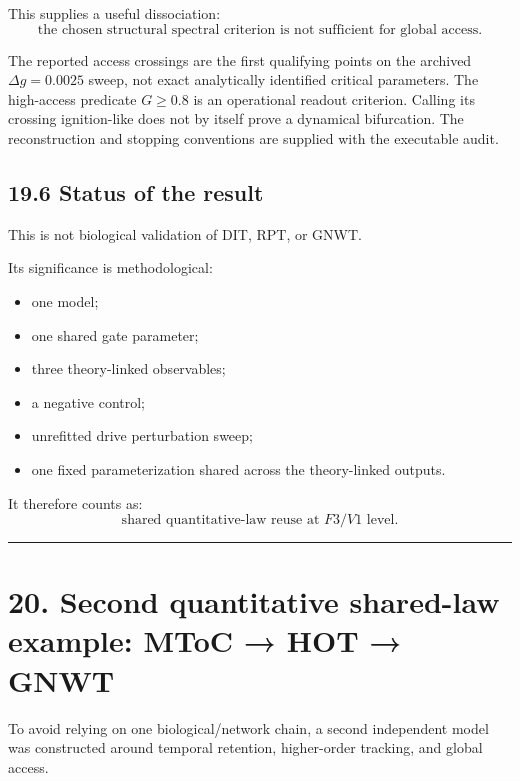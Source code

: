\documentclass[
  11pt,
  a4paper,
]{article}
\providecommand{\tightlist}{%
  \setlength{\itemsep}{0pt}\setlength{\parskip}{0pt}}
\begin{document}
This supplies a useful dissociation:
\nopagebreak[4]
\[
\boxed{
\text{the chosen structural spectral criterion is not sufficient for global access.}
}
\]

The reported access crossings are the first qualifying points on the
archived \(\Delta g=0.0025\) sweep, not exact analytically identified
critical parameters. The high-access predicate \(G\geq0.8\) is an
operational readout criterion. Calling its crossing ignition-like does
not by itself prove a dynamical bifurcation. The reconstruction and
stopping conventions are supplied with the executable audit.

\hypertarget{status-of-the-result}{%
\subsection{19.6 Status of the result}\label{status-of-the-result}}

This is not biological validation of DIT, RPT, or GNWT.

Its significance is methodological:

\begin{itemize}
\tightlist
\item
  one model;
\item
  one shared gate parameter;
\item
  three theory-linked observables;
\item
  a negative control;
\item
  unrefitted drive perturbation sweep;
\item
  one fixed parameterization shared across the theory-linked outputs.
\end{itemize}

It therefore counts as:
\nopagebreak[4]
\[
\boxed{
\text{shared quantitative-law reuse at }F3/V1\text{ level}.
}
\]

\begin{center}\rule{0.5\linewidth}{0.5pt}\end{center}

\hypertarget{second-quantitative-shared-law-example-mtoc-hot-gnwt}{%
\section{20. Second quantitative shared-law example: MToC → HOT →
GNWT}\label{second-quantitative-shared-law-example-mtoc-hot-gnwt}}

To avoid relying on one biological/network chain, a second independent
model was constructed around temporal retention, higher-order tracking,
and global access.
\end{document}
